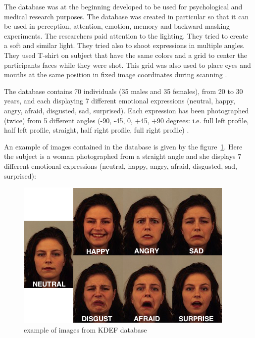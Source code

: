 \noindent The database was at the beginning developed to be used for psychological and medical research purposes. The database was created in particular so that it can be used in perception, attention, emotion, memory and backward masking experiments. The researchers paid attention to the lighting. They tried to create a soft and similar light. They tried also to shoot expressions in multiple angles. They used T-shirt on subject that have the same colors and a grid to center the participants faces while they were shot. This grid was also used to place eyes and mouths at the same position in fixed image coordinates during scanning \cite{KDEF}.
\newline

\noindent The database contains 70 individuals (35 males and 35 females), from 20 to 30 years,  and each displaying 7 different emotional expressions (neutral, happy, angry, afraid, disgusted, sad, surprised). Each expression has been photographed (twice) from 5 different angles (-90, -45, 0, +45, +90 degrees: i.e. full left profile, half left profile, straight, half right profile, full right profile)  \cite{KDEF}.
\newline

\noindent An example of images contained in the database is given by the figure~\ref{kdef_7facialexpressions}. Here the subject is a woman photographed from a straight angle and she displays 7 different emotional expressions (neutral, happy, angry, afraid, disgusted, sad, surprised): 
\newline

\begin{figure}[!h]
\begin{center}
\noindent \includegraphics[scale=0.65]{figures/kdef_7facialexpressions} 
\newline
\caption{example of images from KDEF database}
\label{kdef_7facialexpressions}
\end{center} 
\end{figure}

